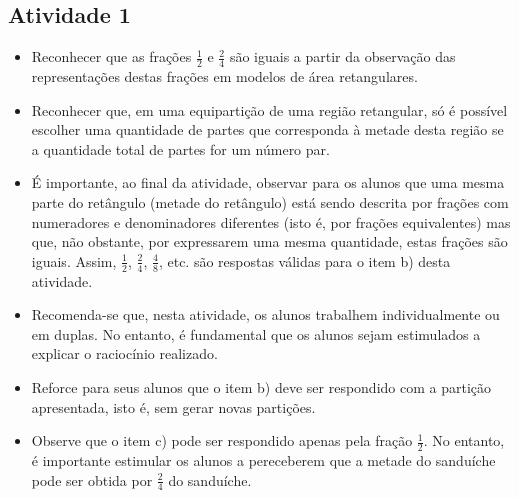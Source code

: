 \begin{multicols}{2}



\subsection{Atividade 1}

\begin{itemize} %
    \item       Reconhecer que as frações       $\frac{1}{2}$       e       
$\frac{2}{4}$       são iguais a partir da observação das representações destas 
frações em modelos de área retangulares.
    \item       Reconhecer que, em uma equipartição de uma região retangular, só 
é possível escolher uma quantidade de partes que corresponda à metade desta 
região se a quantidade total de partes for um número par.
    \item       É importante, ao final da atividade, observar para os alunos que 
uma mesma parte do retângulo (metade do retângulo) está sendo descrita por 
frações com numeradores e denominadores diferentes (isto é, por frações 
equivalentes) mas que, não obstante, por expressarem uma mesma quantidade, estas 
frações são iguais. Assim,       $\frac{1}{2}$,       $\frac{2}{4}$,       
$\frac{4}{8}$, etc. são respostas válidas para o item b) desta atividade.
\end{itemize} %
  
  
 
  
\begin{itemize} %
    \item       Recomenda-se que, nesta atividade, os alunos trabalhem 
individualmente ou em duplas. No entanto, é fundamental que os alunos sejam 
estimulados a explicar o raciocínio realizado.
    \item       Reforce para seus alunos que o item b) deve ser respondido com a 
partição apresentada, isto é, sem gerar novas partições.
    \item       Observe que o item c) pode ser respondido apenas pela fração     
  $\frac{1}{2}$. No entanto, é importante estimular os alunos a pereceberem que 
a metade do sanduíche pode ser obtida por       $\frac{2}{4}$       do 
sanduíche. 
\end{itemize} %
  
  
  \vspace{.1cm}
  

\end{multicols}
